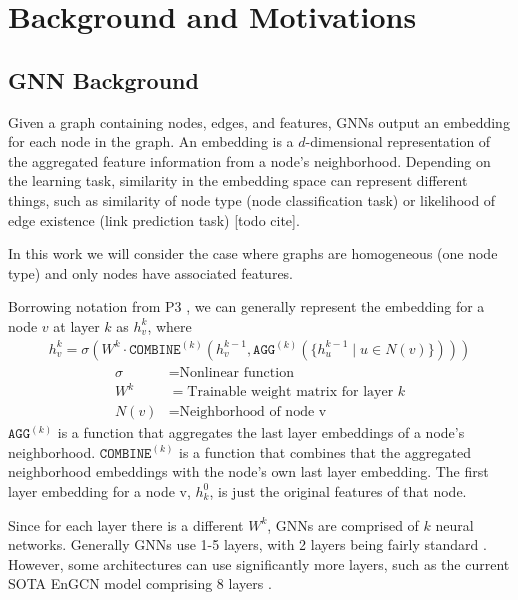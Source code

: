 \chapter{Background and Motivations}

\section{GNN Background}
Given a graph containing nodes, edges, and features, GNNs output an embedding for each node in the graph. 
An embedding is a $d$-dimensional representation of the aggregated feature information from a node's neighborhood. 
Depending on the learning task, similarity in the embedding space can represent different things, such as similarity of node type (node classification task) or likelihood of edge existence (link prediction task) [todo cite]. 

In this work we will consider the case where graphs are homogeneous (one node type) and only nodes have associated features.

Borrowing notation from P3 \cite{P3_2021}, we can generally represent the embedding for a node $v$ at layer $k$ as $h_v^k$, where
\begin{align} \label{GNN Equation}
    h_v^k = \sigma \left(
         W^k \cdot 
         \mathtt{COMBINE}^{(k)} \left(
            h_v^{k-1},
            \mathtt{AGG}^{(k)} \left( 
                    \{ h_u^{k-1} \mid u \in N(v) \}
                \right) 
         \right)
     \right)
\end{align}
\begin{align*}
    \sigma &= \text{Nonlinear function} \\
    W^k &= \text{Trainable weight matrix for layer $k$} \\
    N(v) &= \text{Neighborhood of node v}
\end{align*}
$\mathtt{AGG}^(k)$ is a function that aggregates the last layer embeddings of a node's neighborhood. $\mathtt{COMBINE}^(k)$ is a function that combines that the aggregated neighborhood embeddings with the node's own last layer embedding. The first layer embedding for a node v, $h_k^0$, is just the original features of that node.

Since for each layer there is a different $W^k$, GNNs are comprised of $k$ neural networks. Generally GNNs use 1-5 layers, with 2 layers being fairly standard \cite{Survey_First_2022}. However, some architectures can use significantly more layers, such as the current SOTA EnGCN model comprising 8 layers \cite{EnGCN_2023}.

